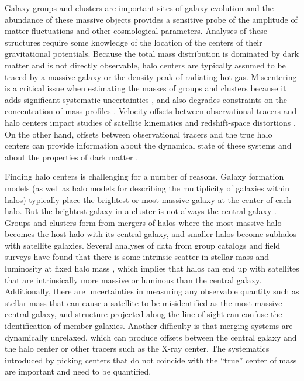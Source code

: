 \documentclass[12pt]{emulateapj}
\begin{document}
Galaxy groups and clusters are important sites of galaxy evolution and
the abundance of these massive objects provides a sensitive probe of
the amplitude of matter fluctuations and other cosmological
parameters. Analyses of these structures require some knowledge of the
location of the centers of their gravitational potentials. Because the
total mass distribution is dominated by dark matter and is not
directly observable, halo centers are typically assumed to be traced
by a massive galaxy or the density peak of radiating hot
gas. Miscentering is a critical issue when estimating the masses 
of groups and clusters because it adds significant systematic
uncertainties \citep[e.g.,][]{Johnston2007a, Johnston2007b,
  Mandelbaum2010, Rozo2011}, and also degrades constraints on the
concentration of mass profiles \citep{Mandelbaum2008}. Velocity
offsets between observational tracers and halo centers impact studies
of satellite kinematics \citep{Skibba2011, Wojtak2011} and
redshift-space distortions \citep{Hikage2012}. On the other hand, offsets between
observational tracers and the true halo centers can provide information about
the dynamical state of these systems and about the properties of dark
matter \citep{Clowe2006, Massey2011}.

Finding halo centers is challenging for a number of reasons. Galaxy
formation models (as well as halo models for describing the
multiplicity of galaxies within halos) typically place the brightest
or most massive galaxy at the center of each halo. But the brightest
galaxy in a cluster is not always the central galaxy \citep[][and
references therein]{Skibba2011}. Groups and clusters form from mergers
of halos where the most massive halo becomes the host halo with its
central galaxy, and smaller halos become subhalos with satellite
galaxies. Several analyses of data from group
    catalogs and field surveys have found that there is some intrinsic scatter
    in stellar mass and luminosity at fixed halo mass \citep{Yang2009,
      More2009, Leauthaud2012, Reddick2012}, which implies that
    halos can end up with satellites that are intrinsically more
    massive or luminous than the central galaxy. Additionally, there are
uncertainties in measuring any observable quantity such as stellar
mass that can cause a satellite to be misidentified as the most
massive central galaxy, and structure projected along the line of
sight can confuse the identification of member galaxies. Another difficulty
is that merging systems are dynamically unrelaxed, which can produce offsets
between the central galaxy and the halo center or other tracers such
as the X-ray center.  The systematics introduced by picking centers
that do not coincide with the ``true'' center of mass are important
and need to be quantified.
\end{document}
